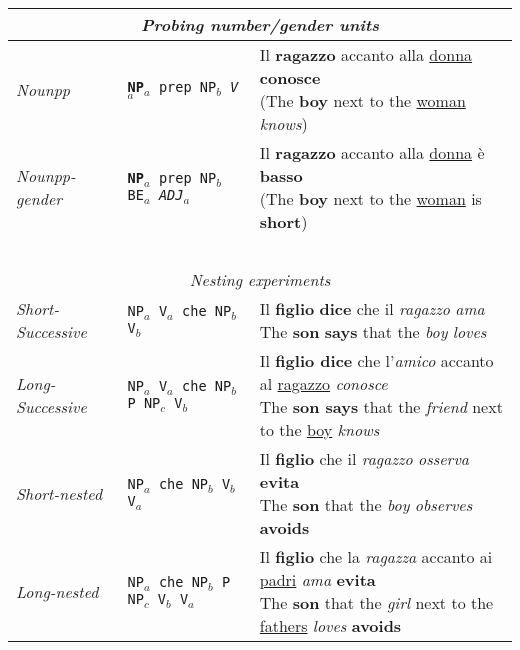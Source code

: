 \begin{table}[h!]
    \setlength\tabcolsep{2mm}
\small
\centering
\begin{tabular}{lll}
\multicolumn{3}{c}{\centering \textit{Probing number/gender units}}\\
\hline
\hline
\emph{Nounpp} & \texttt{\textbf{NP$_a$} prep NP$_b$ \emph{V$_a$}} & \specialcell{Il \textbf{ragazzo} accanto alla \underline{donna} \textbf{conosce}\vspace{-3mm}\\({\scriptsize The \textbf{boy} next to the \underline{woman} \emph{knows}})} \\
\emph{Nounpp-gender} & \texttt{\textbf{NP$_a$} prep NP$_b$ BE$_a$ \emph{ADJ$_a$}} & \specialcell{Il \textbf{ragazzo} accanto alla \underline{donna} \`{e} \textbf{basso}\vspace{-3mm}\\({\scriptsize The \textbf{boy} next to the \underline{woman} is \textbf{short}})}\\
~\\
\multicolumn{3}{c}{\centering \textit{Nesting experiments}}\\
\hline
\hline
\emph{Short-Successive} & \texttt{NP$_a$ V$_a$ che NP$_b$ V$_b$} & \specialcell{Il \textbf{figlio} \textbf{dice} che il \emph{ragazzo} \emph{ama}\vspace{-3mm}\\{\scriptsize The \textbf{son} \textbf{says} that the \emph{boy} \emph{loves}}} \\
\emph{Long-Successive} & \texttt{NP$_a$ V$_a$ che NP$_b$ P NP$_c$ V$_b$} & \specialcell{Il \textbf{figlio dice} che l'\emph{amico} accanto al \underline{ragazzo} \emph{conosce}\vspace{-3mm}\\{\scriptsize The \textbf{son says} that the \emph{friend} next to the \underline{boy} \emph{knows}}} \\
\emph{Short-nested} & \texttt{NP$_a$ che NP$_b$ V$_b$ V$_a$ } & \specialcell{Il \textbf{figlio} che il \emph{ragazzo} \emph{osserva} \textbf{evita}\vspace{-3mm}\\{\scriptsize The \textbf{son} that the \emph{boy} \emph{observes} \textbf{avoids}}} \\
\emph{Long-nested} & \texttt{NP$_a$ che NP$_b$ P NP$_c$ V$_b$ V$_a$} & \specialcell{Il \textbf{figlio} che la \emph{ragazza} accanto ai \underline{padri} \emph{ama} \textbf{evita}\vspace{-3mm}\\{\scriptsize The \textbf{son} that the \emph{girl} next to the \underline{fathers} \emph{loves} \textbf{avoids}}} \\

\end{tabular}
\end{table}
